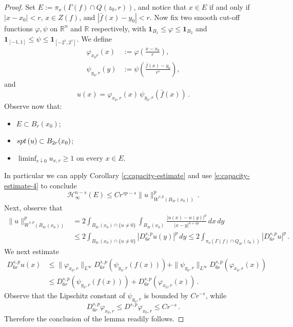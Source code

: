 \documentclass[10pt,a4paper]{amsart}
\renewcommand{\H}{\mathcal{H}}
\begin{document}
\begin{proof}
Set $E:=\pi_o (\Gamma (f)\cap Q(z_0,r))$, and notice that $x\in E$ if and only if $|x-x_0|<r$, $x\in Z(f)$, and $|\bar{f}(x)-y_0|<r$. Now fix two smooth cut-off functions $\varphi, \psi$ on $\mathbb R^n$ and $\mathbb R$ respectively, with $\mathbf{1}_{B_1}\le\varphi\le \mathbf{1}_{B_2}$ and $\mathbf{1}_{[-1,1]} \le \psi \le\mathbf{1}_{[-2^s, 2^s]}$. We define 
\begin{align*}
\varphi_{x_0 r}(x) &:= \varphi \left(\frac{x-x_0}{r}\right),\\
\psi_{y_0,r} (y) &:= \psi \left(\frac{\bar{f}(x)-y_0}{r^s}\right),
\end{align*}
and 
\[
u(x) =\varphi_{x_0, r} (x)\, \psi_{y_0,r} (\bar{f} (x))\, .
\]
Observe now that:
\begin{itemize}
\item $E\subset B_r (x_0)$;
\item ${\rm spt}\, (u) \subset B_{2r} (x_0)$;
\item $\liminf_{r\downarrow 0} u_{x,r}\geq 1$ on every $x\in E$.
\end{itemize}
In particular we can apply Corollary \ref{c:capacity-estimate} and use \eqref{e:capacity-estimate-4} to conclude
\[
\H^{n-s}_\infty(E)\le Cr^{sp-s}\|u\|^p_{\dot{W}^{s,p}(B_{3r} (x_0))}\, .
\]
Next, observe that 
\begin{align*}
\|u\|^p_{\dot{W}^{s,p}(B_{3r}(x_0))} 
&= 2 \int_{B_{3r} (x_0) \cap \{u\neq 0\}} \int_{B_{3r} (x_0)} \frac{|u(x)-u(y)|^p}{|x-y|^{n+sp}}\, dx\, dy \\
&\leq 2 \int_{B_{3r} (x_0)\cap \{u\neq 0\}} |D^{s,p}_{6r} u (y)|^p\, dy 
\leq 2 \int_{\pi_o (\Gamma (f)\cap Q_{2r} (z_0))} |D^{s,p}_{6r} u|^p\, . 
\end{align*}
We next estimate
\begin{align*}
D^{s,p}_{6r}u(x) & \le \|\varphi_{x_0,r}\|_{L^\infty}D ^{s,p}_{6r} (\psi_{y_0,r}(f (x)))+\|\psi_{y_0,r}\|_{L^\infty} D^{s,p}_{6r}(\varphi_{x_0,r}(x))\\
& \le D^{s,p}_{6r}(\psi_{y_0,r}(f(x)))+D^{s,p}_{6r}(\varphi_{x_0,r}(x))\, .
\end{align*}
Observe that the Lipschitz constant of $\psi_{y_0,r}$ is bounded by $C r^{-s}$, while 
\[
D^{s,p}_{6r} \varphi_{x_0,r} \leq D^{s,p} \varphi_{x_0,r} \leq C r^{-s}\, .
\] 
Therefore the conclusion of the lemma readily follows.
\end{proof}
\end{document}
